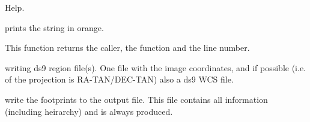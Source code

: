 \documentclass[letterpaper,10pt,english]{sphinxmanual}
\begin{document}

\begin{fulllineitems}
\label{SamPy.astronomy:SamPy.astronomy.footprintfinder.usage}
Help.

\end{fulllineitems}



\begin{fulllineitems}
\label{SamPy.astronomy:SamPy.astronomy.footprintfinder.warning}
prints the string in orange.

\end{fulllineitems}



\begin{fulllineitems}
\label{SamPy.astronomy:SamPy.astronomy.footprintfinder.whocalls}
This function returns the caller, the function and the line number.

\end{fulllineitems}



\begin{fulllineitems}
\label{SamPy.astronomy:SamPy.astronomy.footprintfinder.writeds9output}
writing ds9 region file(s). One file with the image coordinates, and if possible (i.e. of the projection
is RA-TAN/DEC-TAN) also a ds9 WCS file.

\end{fulllineitems}



\begin{fulllineitems}
\label{SamPy.astronomy:SamPy.astronomy.footprintfinder.writeoutput}
write the footprints to the output file. This file contains all information (including heirarchy) and is 
always produced.

\end{fulllineitems}
\end{document}
